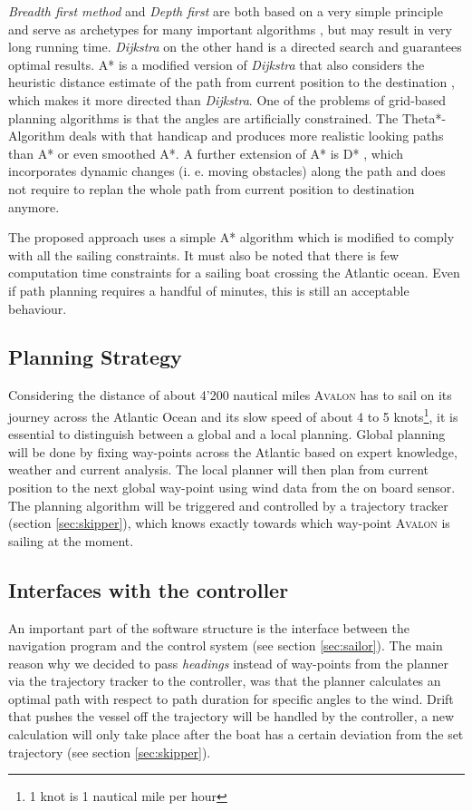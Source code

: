 \textit{Breadth first method} and \textit{Depth first} are both based on a very
simple principle and serve as archetypes for many important algorithms
\cite{cormen2001}, but may result in very long running time. \textit{Dijkstra}
on the other hand is a directed search \cite{lavalle2006} and guarantees
optimal results. A* is a modified version of \textit{Dijkstra} that also
considers the heuristic distance estimate of the path from current position to
the destination \cite{hart1968}, which makes it more directed than
\textit{Dijkstra}. One of the problems of grid-based planning algorithms is
that the angles are artificially constrained. The Theta*-Algorithm
\cite{nash2007} deals with that handicap and produces more realistic looking
paths than A* or even smoothed A*. A further extension of A* is D*
\cite{stentz1995}, which incorporates dynamic changes (i. e. moving obstacles)
along the path and does not require to replan the whole path from current
position to destination anymore.

The proposed approach uses a simple A* algorithm which is modified to comply
with all the sailing constraints. It must also be noted that there is few
computation time constraints for a sailing boat crossing the Atlantic ocean.
Even if path planning requires a handful of minutes, this is still an
acceptable behaviour.
%
\subsection{Planning Strategy}
%
Considering the distance of about 4'200 nautical miles \textsc{Avalon} has to
sail on its journey across the Atlantic Ocean and its slow speed of
about 4 to 5 knots\footnote{1 knot is 1 nautical mile per hour}, it is essential to distinguish between a global and a local
planning. Global planning will be done by fixing way-points across the Atlantic
based on expert knowledge, weather and current analysis. The local planner will
then plan from current position to the next global way-point using wind data
from the on board sensor. The planning algorithm will be triggered and
controlled by a trajectory tracker (section \ref{sec:skipper}), which knows
exactly towards which way-point \textsc{Avalon} is sailing at the moment.
%
\subsection{Interfaces with the controller}
An important part of the software structure is the interface between the
navigation program and the control system (see section \ref{sec:sailor}). The main
reason why we decided to pass \textit{headings} instead of way-points from the
planner via the trajectory tracker to the controller, was that the planner calculates an optimal
path with respect to path duration for specific angles to the wind.
Drift that pushes the vessel off the trajectory will be handled by the controller,
a new calculation will only take place after the boat has a certain deviation
from the set trajectory (see section \ref{sec:skipper}).
